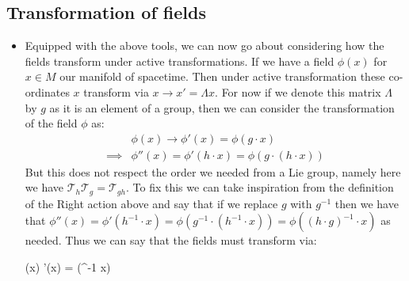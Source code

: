 \documentclass[11pt]{article}
\renewenvironment{flalign}{\vspace{-2mm}\empheq[box=\tcbhighmath]{align}}{\endempheq}
\numberwithin{equation}{section}
\begin{document}
     \subsection{Transformation of fields}
     \begin{itemize}
       \item Equipped with the above tools, we can now go about considering how the fields transform under active transformations. If we have a field $\phi(x)$ for $x \in M$ our manifold of spacetime. Then under active transformation these co-ordinates $x$ transform via $x \rightarrow x' = \Lambda x$. For now if we denote this matrix $\Lambda$ by $g$ as it is an element of a group, then we can consider the transformation of the field $\phi$ as:
       \vspace{-2mm}
       \begin{align*}
       & \phi(x) \rightarrow \phi'(x) = \phi(g \cdot x) \\ 
       \implies & \phi''(x) = \phi'(h\cdot x) = \phi(g\cdot (h \cdot x)) 
       \end{align*}
       But this does not respect the order we needed from a Lie group, namely here we have $\mathcal{T}_{h}\mathcal{T}_{g}=\mathcal{T}_{gh}$. To fix this we can take inspiration from the definition of the Right action above and say that if we replace $g$ with $g^{-1}$ then we have that $\phi''(x) = \phi'(h^{-1}\cdot x) = \phi(g^{-1}\cdot (h^{-1} \cdot x)) = \phi((h\cdot g)^{-1} \cdot x)$ as needed. Thus we can say that the fields must transform via:

       \begin{flalign}
       \label{phi_transform}
       \phi(x) \rightarrow \phi'(x) = \phi(\Lambda^{-1} \cdot x)
       \end{flalign}
     \end{itemize}
\end{document}
